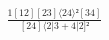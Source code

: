 \documentclass[varwidth, border=5pt]{standalone}
\begin{document}
\begin{my}
$\begin{gathered}
\scriptscriptstyle\frac{1[12][23]⟨24⟩²[34]}{[24]⟨2|3+4|2]²}
\end{gathered}$
\end{my}
\end{document}
